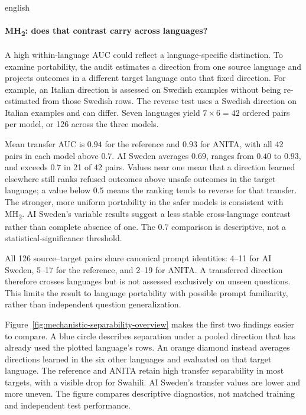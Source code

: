 \begin{otherlanguage*}{english}
\paragraph*{MH\textsubscript{2}: does that contrast carry across languages?} A high within-language AUC could reflect a language-specific distinction. To examine portability, the audit estimates a direction from one source language and projects outcomes in a different target language onto that fixed direction. For example, an Italian direction is assessed on Swedish examples without being re-estimated from those Swedish rows. The reverse test uses a Swedish direction on Italian examples and can differ. Seven languages yield $7\times6=42$ ordered pairs per model, or 126 across the three models.

Mean transfer AUC is $0.94$ for the reference and $0.93$ for ANITA, with all 42 pairs in each model above $0.7$. AI Sweden averages $0.69$, ranges from $0.40$ to $0.93$, and exceeds $0.7$ in 21 of 42 pairs. Values near one mean that a direction learned elsewhere still ranks refused outcomes above unsafe outcomes in the target language; a value below $0.5$ means the ranking tends to reverse for that transfer. The stronger, more uniform portability in the safer models is consistent with MH\textsubscript{2}. AI Sweden's variable results suggest a less stable cross-language contrast rather than complete absence of one. The $0.7$ comparison is descriptive, not a statistical-significance threshold.

All 126 source--target pairs share canonical prompt identities: 4--11 for AI Sweden, 5--17 for the reference, and 2--19 for ANITA. A transferred direction therefore crosses languages but is not assessed exclusively on unseen questions. This limits the result to language portability with possible prompt familiarity, rather than independent question generalization.

Figure~\ref{fig:mechanistic-separability-overview} makes the first two findings easier to compare. A blue circle describes separation under a pooled direction that has already used the plotted language's rows. An orange diamond instead averages directions learned in the six other languages and evaluated on that target language. The reference and ANITA retain high transfer separability in most targets, with a visible drop for Swahili. AI Sweden's transfer values are lower and more uneven. The figure compares descriptive diagnostics, not matched training and independent test performance.


\FloatBarrier


\end{otherlanguage*}
